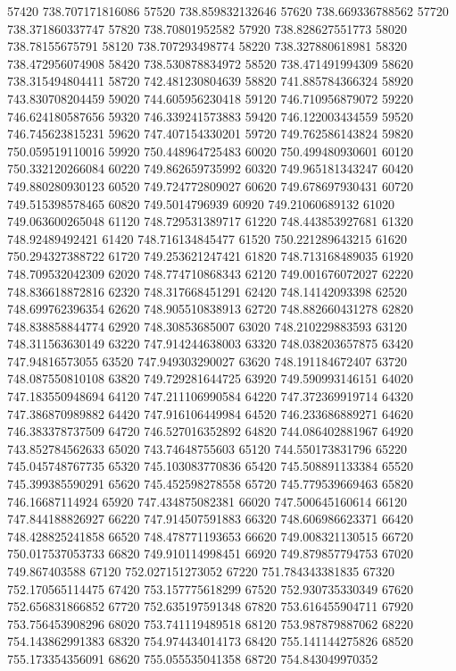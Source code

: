 {57420 738.707171816086
57520 738.859832132646
57620 738.669336788562
57720 738.371860337747
57820 738.70801952582
57920 738.828627551773
58020 738.78155675791
58120 738.707293498774
58220 738.327880618981
58320 738.472956074908
58420 738.530878834972
58520 738.471491994309
58620 738.315494804411
58720 742.481230804639
58820 741.885784366324
58920 743.830708204459
59020 744.605956230418
59120 746.710956879072
59220 746.624180587656
59320 746.339241573883
59420 746.122003434559
59520 746.745623815231
59620 747.407154330201
59720 749.762586143824
59820 750.059519110016
59920 750.448964725483
60020 750.499480930601
60120 750.332120266084
60220 749.862659735992
60320 749.965181343247
60420 749.880280930123
60520 749.724772809027
60620 749.678697930431
60720 749.515398578465
60820 749.5014796939
60920 749.21060689132
61020 749.063600265048
61120 748.729531389717
61220 748.443853927681
61320 748.92489492421
61420 748.716134845477
61520 750.221289643215
61620 750.294327388722
61720 749.253621247421
61820 748.713168489035
61920 748.709532042309
62020 748.774710868343
62120 749.001676072027
62220 748.836618872816
62320 748.317668451291
62420 748.14142093398
62520 748.699762396354
62620 748.905510838913
62720 748.882660431278
62820 748.838858844774
62920 748.30853685007
63020 748.210229883593
63120 748.311563630149
63220 747.914244638003
63320 748.038203657875
63420 747.94816573055
63520 747.949303290027
63620 748.191184672407
63720 748.087550810108
63820 749.729281644725
63920 749.590993146151
64020 747.183550948694
64120 747.211106990584
64220 747.372369919714
64320 747.386870989882
64420 747.916106449984
64520 746.233686889271
64620 746.383378737509
64720 746.527016352892
64820 744.086402881967
64920 743.852784562633
65020 743.74648755603
65120 744.550173831796
65220 745.045748767735
65320 745.103083770836
65420 745.508891133384
65520 745.399385590291
65620 745.452598278558
65720 745.779539669463
65820 746.16687114924
65920 747.434875082381
66020 747.500645160614
66120 747.844188826927
66220 747.914507591883
66320 748.606986623371
66420 748.428825241858
66520 748.478771193653
66620 749.008321130515
66720 750.017537053733
66820 749.910114998451
66920 749.879857794753
67020 749.867403588
67120 752.027151273052
67220 751.784343381835
67320 752.170565114475
67420 753.157775618299
67520 752.930735330349
67620 752.656831866852
67720 752.635197591348
67820 753.616455904711
67920 753.756453908296
68020 753.741119489518
68120 753.987879887062
68220 754.143862991383
68320 754.974434014173
68420 755.141144275826
68520 755.173354356091
68620 755.055535041358
68720 754.843049970352
}
